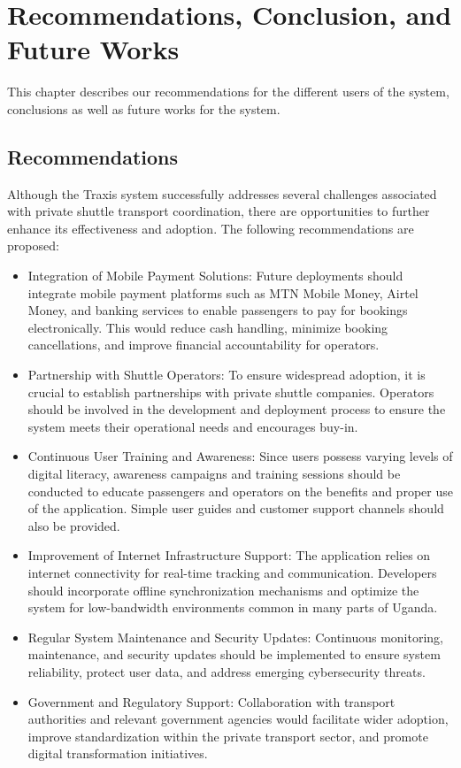 \chapter{Recommendations, Conclusion, and Future Works}
\label{chap:recommendations-conclusion-future-works}
This chapter describes our recommendations for the different users of the
system, conclusions as well as future works for the system.
\section{Recommendations}
Although the Traxis system successfully addresses several challenges associated with private shuttle transport coordination, there are opportunities to further enhance its effectiveness and adoption. The following recommendations are proposed:
\begin{itemize}
\item Integration of Mobile Payment Solutions: Future deployments should integrate mobile payment platforms such as MTN Mobile Money, Airtel Money, and banking services to enable passengers to pay for bookings electronically. This would reduce cash handling, minimize booking cancellations, and improve financial accountability for operators.

\item Partnership with Shuttle Operators: To ensure widespread adoption, it is crucial to establish partnerships with private shuttle companies. Operators should be involved in the development and deployment process to ensure the system meets their operational needs and encourages buy-in.

\item Continuous User Training and Awareness: Since users possess varying levels of digital literacy, awareness campaigns and training sessions should be conducted to educate passengers and operators on the benefits and proper use of the application. Simple user guides and customer support channels should also be provided.

\item Improvement of Internet Infrastructure Support: The application relies on internet connectivity for real-time tracking and communication. Developers should incorporate offline synchronization mechanisms and optimize the system for low-bandwidth environments common in many parts of Uganda.

\item Regular System Maintenance and Security Updates: Continuous monitoring, maintenance, and security updates should be implemented to ensure system reliability, protect user data, and address emerging cybersecurity threats.

\item Government and Regulatory Support: Collaboration with transport authorities and relevant government agencies would facilitate wider adoption, improve standardization within the private transport sector, and promote digital transformation initiatives.
\end{itemize}

